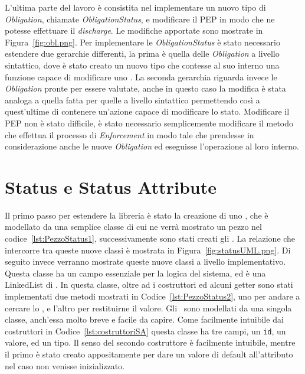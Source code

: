 L'ultima parte del lavoro è consistita nel implementare un nuovo tipo di \textit{Obligation}, chiamate \textit{ObligationStatus}, e modificare il PEP in modo che ne potesse effettuare il \textit{discharge}. Le modifiche apportate sono mostrate in Figura~\ref{fig:obl.png}. Per implementare le \textit{ObligationStatus} è stato necessario estendere due gerarchie differenti, la prima è quella delle \textit{Obligation} a livello sintattico, dove è stato creato un nuovo tipo che contesse al suo interno una funzione capace di modificare uno \statusattribute. La seconda gerarchia riguarda invece le \textit{Obligation} pronte per essere valutate, anche in questo caso la modifica è stata analoga a quella fatta per quelle a livello sintattico permettendo così a quest'ultime di contenere un'azione capace di modificare lo stato. Modificare il PEP non è stato difficile, è stato necessario semplicemente modificare il metodo che effettua il processo di  \textit{Enforcement} in modo tale che prendesse in considerazione anche le nuove \textit{Obligation} ed eseguisse l'operazione al loro interno.






\section{Status e Status Attribute} %
\label{sec:status_e_status_attribute}
Il primo passo per estendere la libreria è stato la creazione di uno \status, che è modellato da una semplice classe 
di cui ne verrà mostrato un pezzo nel codice~\ref{lst:PezzoStatus1}, successivamente sono stati creati gli \statusattribute.
La relazione che intercorre tra queste nuove classi è mostrata in Figura~\ref{fig:statusUML.png}.
Di seguito invece verranno mostrate queste nuove classi a livello implementativo.
Questa classe ha un campo essenziale per la logica del sistema, ed è una LinkedList di \statusattribute.
In questa classe, oltre ad i costruttori ed alcuni getter sono stati implementati due metodi mostrati in Codice~\ref{lst:PezzoStatus2}, uno per andare a cercare lo \statusattribute, e l'altro per restituirne il valore.
Gli \statusattribute \ sono modellati da una singola classe, anch'essa molto breve e facile da capire.
Come facilmente intuibile dai costruttori in Codice~\ref{lst:costruttoriSA} questa classe ha tre campi, un \texttt{id}, un valore, ed un tipo. 
Il senso del secondo costruttore è facilmente intuibile, mentre il primo è stato creato appositamente per dare un valore di default all'attributo nel caso non venisse inizializzato.

